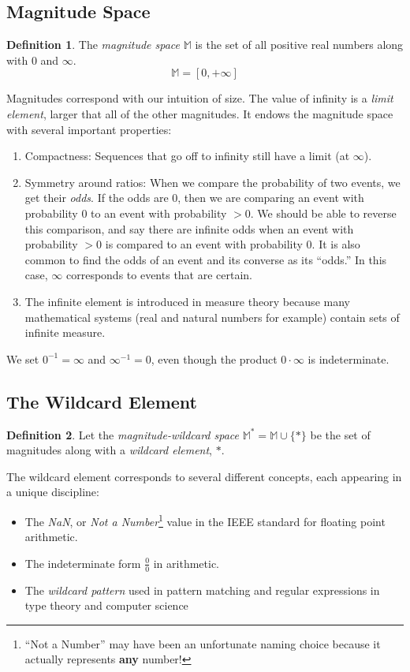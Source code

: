 \documentclass[twoside]{article}
\newcommand{\quotes}[1]{``#1''}
\theoremstyle{plain}%
\theoremstyle{definition}
\newtheorem{definition}{Definition}[section]
\theoremstyle{remark}
\begin{document}
\subsection{Magnitude Space}

\begin{definition}
The \textit{magnitude space} \(\mathbb{M}\) is the set of all positive real numbers along with \(0\) and \(\infty\).
\[\mathbb{M} = [0, +\infty]\]
\end{definition}

Magnitudes correspond with our intuition of size. The value of infinity is a \textit{limit element}, larger that all of the other magnitudes. It endows the magnitude space with several important properties:

\begin{enumerate}
\item Compactness: Sequences that go off to infinity still have a limit (at \(\infty\)).
\item Symmetry around ratios: When we compare the probability of two events, we get their \textit{odds}. If the odds are 0, then we are comparing an event with probability 0 to an event with probability \(>0\). We should be able to reverse this comparison, and say there are infinite odds when an event with probability \(>0\) is compared to an event with probability 0. It is also common to find the odds of an event and its converse as its \quotes{odds.} In this case, \(\infty\) corresponds to events that are certain.
\item The infinite element is introduced in measure theory because many mathematical systems (real and natural numbers for example) contain sets of infinite measure.
\end{enumerate}

We set \(0^{-1} = \infty\) and \(\infty^{-1} = 0\), even though the product \(0 \cdot \infty\) is indeterminate.

\subsection{The Wildcard Element}

\begin{definition}
Let the \textit{magnitude-wildcard space} \(\mathbb{M}^*= \mathbb{M} \cup \{\ast\}\) be the set of magnitudes along with a \textit{wildcard element}, \(\ast\).
\end{definition}

The wildcard element corresponds to several different concepts, each appearing in a unique discipline:
\begin{itemize}
  \item The \textit{NaN}, or \textit{Not a Number}\footnote{\quotes{Not a Number} may have been an unfortunate naming choice because it actually represents \textbf{any} number!} value in the IEEE standard for floating point arithmetic\cite{ieee}.
  \item The indeterminate form \(\frac{0}{0}\) in arithmetic.
  \item The \textit{wildcard pattern} used in pattern matching and regular expressions in type theory and computer science
\end{itemize}
\end{document}
